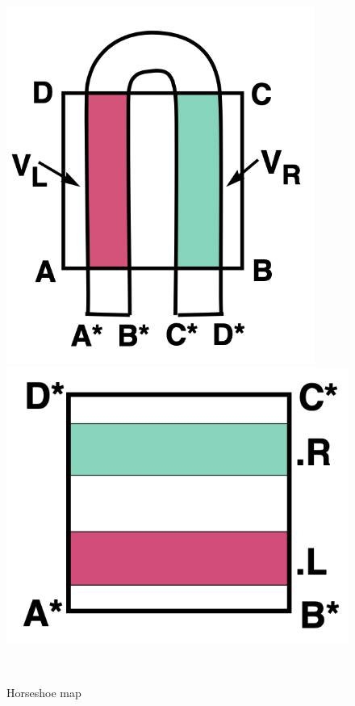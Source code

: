 \documentclass[12pt]{article}
\theoremstyle{plain}
\begin{document}
\begin{figure}[H]
\begin{minipage}[c][0.24\width]{
   0.24\textwidth}
\end{minipage}
\begin{minipage}[c][0.24\width]{
   0.24\textwidth}
   \centering
   \includegraphics[width=0.9\textwidth]{figure/section5/horseshoe-1-1.png}
\end{minipage}
\begin{minipage}[c][0.24\width]{
   0.24\textwidth}
   \centering
   \includegraphics[width=1\textwidth]{figure/section5/horseshoe-1-2.png}
\end{minipage}
\\[6ex]\caption{Horseshoe map}\label{horseshoe-map}
\end{figure}
\end{document}
